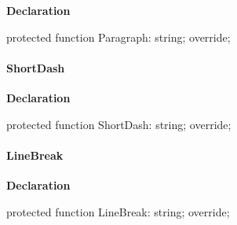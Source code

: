 \documentclass{report}
\newif\ifpdf
\begin{document}
\label{PasDoc_GenLatex.TTexDocGenerator-Paragraph}
\begin{list}{}{
\setlength{\itemindent}{0cm}
\setlength{\listparindent}{0cm}
\setlength{\leftmargin}{\evensidemargin}
\addtolength{\leftmargin}{\tmplength}
\settowidth{\labelsep}{X}
\addtolength{\leftmargin}{\labelsep}
\setlength{\labelwidth}{\tmplength}
}
\item[\textbf{Declaration}\hfill]
\ifpdf
\begin{flushleft}
\fi
\begin{ttfamily}
protected function Paragraph: string; override;\end{ttfamily}

\ifpdf
\end{flushleft}
\fi

\end{list}
\paragraph*{ShortDash}\hspace*{\fill}

\label{PasDoc_GenLatex.TTexDocGenerator-ShortDash}
\begin{list}{}{
\setlength{\itemindent}{0cm}
\setlength{\listparindent}{0cm}
\setlength{\leftmargin}{\evensidemargin}
\addtolength{\leftmargin}{\tmplength}
\settowidth{\labelsep}{X}
\addtolength{\leftmargin}{\labelsep}
\setlength{\labelwidth}{\tmplength}
}
\item[\textbf{Declaration}\hfill]
\ifpdf
\begin{flushleft}
\fi
\begin{ttfamily}
protected function ShortDash: string; override;\end{ttfamily}

\ifpdf
\end{flushleft}
\fi

\end{list}
\paragraph*{LineBreak}\hspace*{\fill}

\label{PasDoc_GenLatex.TTexDocGenerator-LineBreak}
\begin{list}{}{
\setlength{\itemindent}{0cm}
\setlength{\listparindent}{0cm}
\setlength{\leftmargin}{\evensidemargin}
\addtolength{\leftmargin}{\tmplength}
\settowidth{\labelsep}{X}
\addtolength{\leftmargin}{\labelsep}
\setlength{\labelwidth}{\tmplength}
}
\item[\textbf{Declaration}\hfill]
\ifpdf
\begin{flushleft}
\fi
\begin{ttfamily}
protected function LineBreak: string; override;\end{ttfamily}

\ifpdf
\end{flushleft}
\fi

\end{list}
\end{document}
